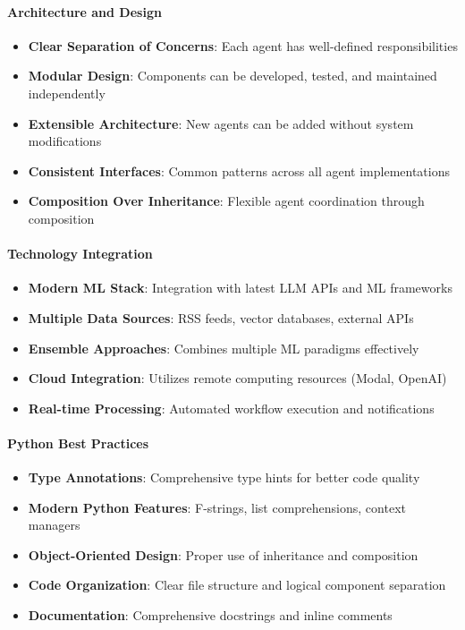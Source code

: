 \paragraph{Architecture and Design \starfull\starfull\starfull\starfull\starfull}
\begin{itemize}
\item \textbf{Clear Separation of Concerns}: Each agent has well-defined responsibilities
\item \textbf{Modular Design}: Components can be developed, tested, and maintained independently
\item \textbf{Extensible Architecture}: New agents can be added without system modifications
\item \textbf{Consistent Interfaces}: Common patterns across all agent implementations
\item \textbf{Composition Over Inheritance}: Flexible agent coordination through composition
\end{itemize}

\paragraph{Technology Integration \starfull\starfull\starfull\starfull\starempty}
\begin{itemize}
\item \textbf{Modern ML Stack}: Integration with latest LLM APIs and ML frameworks
\item \textbf{Multiple Data Sources}: RSS feeds, vector databases, external APIs
\item \textbf{Ensemble Approaches}: Combines multiple ML paradigms effectively
\item \textbf{Cloud Integration}: Utilizes remote computing resources (Modal, OpenAI)
\item \textbf{Real-time Processing}: Automated workflow execution and notifications
\end{itemize}

\paragraph{Python Best Practices \starfull\starfull\starfull\starfull\starempty}
\begin{itemize}
\item \textbf{Type Annotations}: Comprehensive type hints for better code quality
\item \textbf{Modern Python Features}: F-strings, list comprehensions, context managers
\item \textbf{Object-Oriented Design}: Proper use of inheritance and composition
\item \textbf{Code Organization}: Clear file structure and logical component separation
\item \textbf{Documentation}: Comprehensive docstrings and inline comments
\end{itemize}


